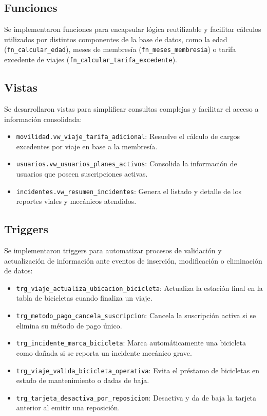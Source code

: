 \subsection{Funciones}

Se implementaron funciones para encapsular lógica reutilizable y facilitar cálculos utilizados por distintos componentes de la base de datos, como la edad (\texttt{fn\_calcular\_edad}), meses de membresía (\texttt{fn\_meses\_membresia}) o tarifa excedente de viajes (\texttt{fn\_calcular\_tarifa\_excedente}).

\subsection{Vistas}

Se desarrollaron vistas para simplificar consultas complejas y facilitar el acceso a información consolidada:
\begin{itemize}
	\item \texttt{movilidad.vw\_viaje\_tarifa\_adicional}: Resuelve el cálculo de cargos excedentes por viaje en base a la membresía.
	\item \texttt{usuarios.vw\_usuarios\_planes\_activos}: Consolida la información de usuarios que poseen suscripciones activas.
	\item \texttt{incidentes.vw\_resumen\_incidentes}: Genera el listado y detalle de los reportes viales y mecánicos atendidos.
\end{itemize}

\subsection{Triggers}

Se implementaron triggers para automatizar procesos de validación y actualización de información ante eventos de inserción, modificación o eliminación de datos:
\begin{itemize}
	\item \texttt{trg\_viaje\_actualiza\_ubicacion\_bicicleta}: Actualiza la estación final en la tabla de bicicletas cuando finaliza un viaje.
	\item \texttt{trg\_metodo\_pago\_cancela\_suscripcion}: Cancela la suscripción activa si se elimina su método de pago único.
	\item \texttt{trg\_incidente\_marca\_bicicleta}: Marca automáticamente una bicicleta como dañada si se reporta un incidente mecánico grave.
	\item \texttt{trg\_viaje\_valida\_bicicleta\_operativa}: Evita el préstamo de bicicletas en estado de mantenimiento o dadas de baja.
	\item \texttt{trg\_tarjeta\_desactiva\_por\_reposicion}: Desactiva y da de baja la tarjeta anterior al emitir una reposición.
\end{itemize}

